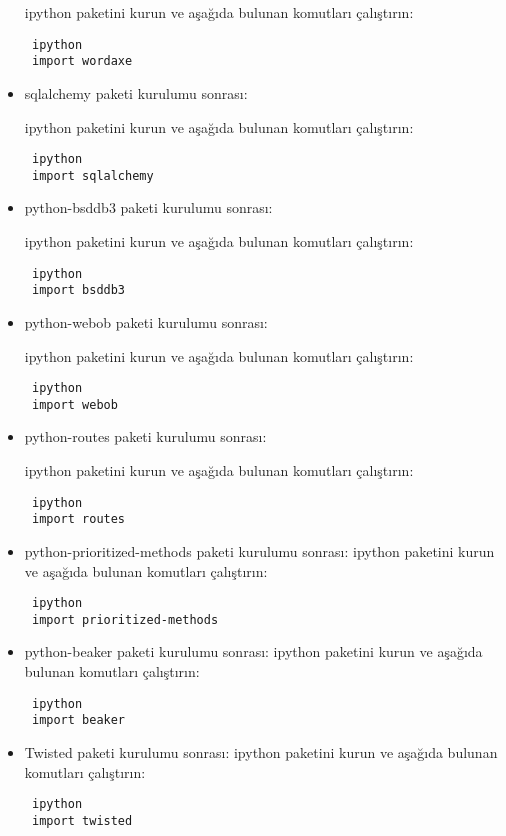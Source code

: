 \documentclass[a4paper,10pt]{article}
\begin{document}
\begin{itemize}
ipython paketini kurun ve aşağıda bulunan komutları çalıştırın:
\begin{verbatim}
 ipython
 import wordaxe
\end{verbatim}


\item sqlalchemy paketi kurulumu sonrası:

ipython paketini kurun ve aşağıda bulunan komutları çalıştırın:
\begin{verbatim}
 ipython
 import sqlalchemy
\end{verbatim}


\item python-bsddb3 paketi kurulumu sonrası:

ipython paketini kurun ve aşağıda bulunan komutları çalıştırın:
\begin{verbatim}
 ipython
 import bsddb3
\end{verbatim}

\item python-webob paketi kurulumu sonrası:

ipython paketini kurun ve aşağıda bulunan komutları çalıştırın:
\begin{verbatim}
 ipython
 import webob
\end{verbatim}

\item python-routes paketi kurulumu sonrası:

ipython paketini kurun ve aşağıda bulunan komutları çalıştırın:
\begin{verbatim}
 ipython
 import routes
\end{verbatim}


\item python-prioritized-methods paketi kurulumu sonrası:
ipython paketini kurun ve aşağıda bulunan komutları çalıştırın:
\begin{verbatim}
 ipython
 import prioritized-methods
\end{verbatim}


\item python-beaker paketi kurulumu sonrası:
ipython paketini kurun ve aşağıda bulunan komutları çalıştırın:
\begin{verbatim}
 ipython
 import beaker
\end{verbatim}

\item Twisted paketi kurulumu sonrası:
ipython paketini kurun ve aşağıda bulunan komutları çalıştırın:
\begin{verbatim}
 ipython
 import twisted
\end{verbatim}


\end{itemize}
\end{document}
